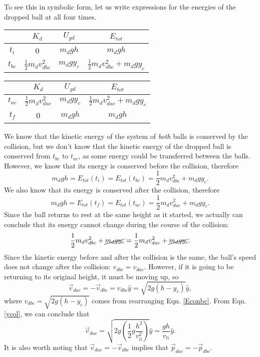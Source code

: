 {To see this in symbolic form, let us write expressions for the energies of the dropped ball at all four times.
\begin{center}
	\begin{tabular}{c|c|c||c}
		& $K_{d}$ & $U_{gd}$ & $E_{tot}$ \\
		\hline
		$t_{i}$ & 0 & $m_{d}gh$ & $m_{d}gh$ \\
		\hline
		$t_{bc}$ & $\frac{1}{2}m_{d}v_{dbc}^{2}$ & $m_{d}gy_{c}$ & $\frac{1}{2}m_{d}v_{dbc}^{2}+m_{d}gy_{c}$
	\end{tabular}
	\begin{tabular}{c|c|c||c}
		& $K_{d}$ & $U_{gd}$ & $E_{tot}$ \\
		\hline
		$t_{ac}$ & $\frac{1}{2}m_{d}v_{dac}^{2}$ & $m_{d}gy_{c}$ & $\frac{1}{2}m_{d}v_{dac}^{2}+m_{d}gy_{c}$ \\
		\hline
		$t_{f}$ & 0 & $m_{d}gh$ & $m_{d}gh$
	\end{tabular}
\end{center}
We know that the kinetic energy of the system of \textit{both} balls is conserved by the collision, but we don't know that the kinetic energy of the dropped ball is conserved from $t_{bc}$ to $t_{ac}$, as some energy could be transferred between the balls. However, we know that its energy is conserved before the collision, therefore
\begin{equation}
	m_{d}gh = E_{tot}(t_{i}) = E_{tot}(t_{bc}) = \frac{1}{2}m_{d}v_{dbc}^{2}+m_{d}gy_{c}.
	\label{Econbc}
\end{equation}
We also know that its energy is conserved after the collision, therefore 
\[
m_{d}gh = E_{tot}(t_{f}) = E_{tot}(t_{ac}) = \frac{1}{2}m_{d}v_{dac}^{2}+m_{d}gy_{c}.
\]
Since the ball returns to rest at the same height as it started, we actually can conclude that its energy cannot change during the course of the collision:
\[
\frac{1}{2}m_{d}v_{dbc}^{2}+\cancel{m_{d}gy_{c}} = \frac{1}{2}m_{d}v_{dac}^{2}+\cancel{m_{d}gy_{c}}.
\]
Since the kinetic energy before and after the collision is the same, the ball's speed does not change after the collision: $v_{dbc} = v_{dac}$. However, if it is going to be returning to its original height, it must be moving up, so
\[
\vec{v}_{dac} = -\vec{v}_{dbc} = v_{dbc}\hat{y} = \sqrt{2g(h-y_{c})}\hat{y},
\]
where $v_{dbc}=\sqrt{2g(h-y_{c})}$ comes from rearranging Eqn. \ref{Econbc}. From Eqn. \ref{ycol}, we can conclude that
\[
\vec{v}_{dac} = \sqrt{2g\left(\frac{1}{2}g\frac{h^{2}}{v_{li}^{2}}\right)}\hat{y} = \frac{gh}{v_{li}}\hat{y}.
\]
It is also worth noting that $\vec{v}_{dac} = -\vec{v}_{dbc}$ implies that $\vec{p}_{dac}=-\vec{p}_{dbc}$.
}

